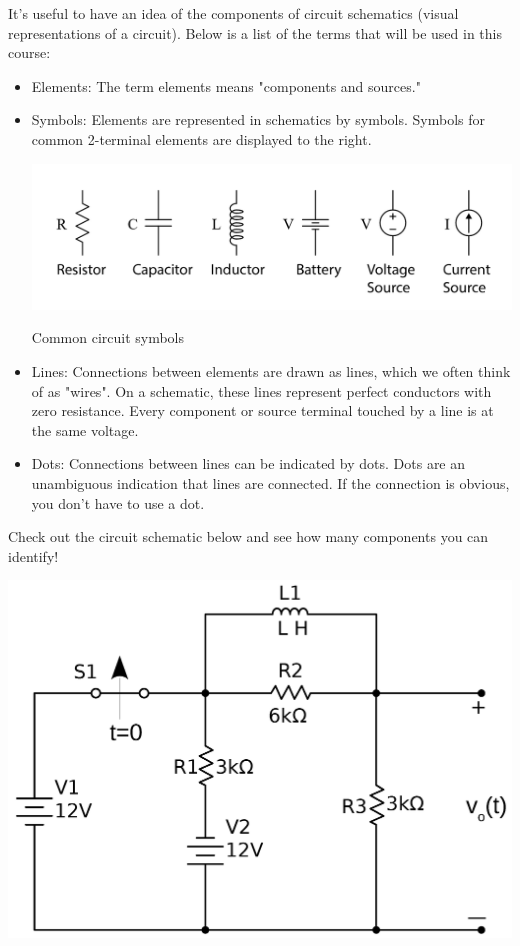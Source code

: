 \documentclass[nobib]{tufte-handout}
\begin{document}
It's useful to have an idea of the components of circuit
schematics (visual representations of a circuit). Below is a list 
of the terms that will be used in this course:
\begin{itemize}
    \item Elements: The term elements means "components and sources."
    \item Symbols: Elements are represented in schematics by symbols. 
    Symbols for common 2-terminal elements are displayed to the right.
    
\begin{marginfigure}
    \centering
    \includegraphics{images/symbols.png}
    \caption{Common circuit symbols}
    \label{fig:symbols}
\end{marginfigure} 

    \item Lines: Connections between elements are drawn as lines, 
    which we often think of as "wires". On a schematic, 
    these lines represent perfect conductors with zero resistance. 
    Every component or source terminal touched by a line is at the same voltage.
    \item Dots: Connections between lines can be indicated by dots. 
    Dots are an unambiguous indication that lines are connected. 
    If the connection is obvious, you don't have to use a dot.
\end{itemize}
Check out the circuit schematic below and see how many components you 
can identify!
\begin{center}
    \includegraphics[width=\textwidth/2]{images/PS0_CapacitorCircuit.png}
\end{center}
\end{document}
